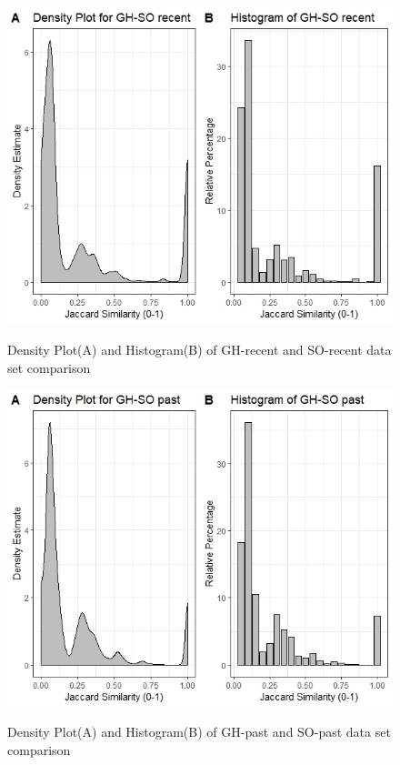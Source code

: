         \begin{figure}
          \centering
          \includegraphics[width=\textwidth]{figures/GH_SO_recent.jpeg}\\
          \caption{Density Plot(A) and Histogram(B) of GH-recent and SO-recent data set comparison}
          \label{fig:GH_SO_recent}
        \end{figure}
        
        \begin{figure}
          \centering
          \includegraphics[width=\textwidth]{figures/GH_SO_past.jpeg}\\
          \caption{Density Plot(A) and Histogram(B) of GH-past and SO-past data set comparison}
          \label{fig:GH_SO_past}
        \end{figure}
        
